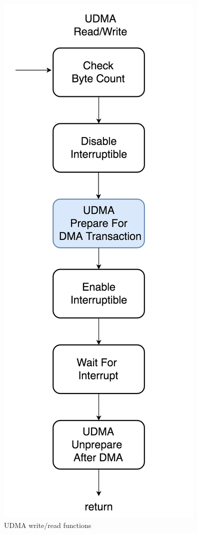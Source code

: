 \begin{figure}[!htb]
  \centering
  \includegraphics[scale=0.2]{images/udma_func.jpeg}
  \caption[UDMA write/read functions.]{UDMA write/read functions}
  \label{fig:UDMA write andread functions.}
\end{figure}

